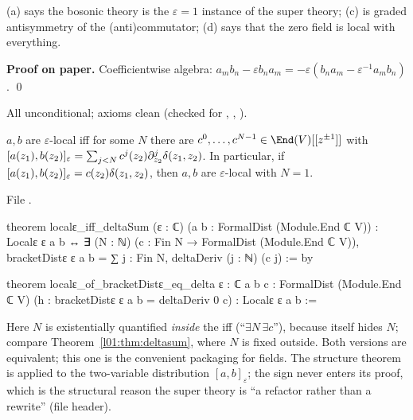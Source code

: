 \begin{physics}
(a) says the bosonic theory is the $\varepsilon = 1$ instance of the super theory; (c) is graded
antisymmetry of the (anti)commutator; (d) says that the zero field is local with everything.
\end{physics}

\textbf{Proof on paper.} Coefficientwise algebra: $a_mb_n-\varepsilon b_na_m = -\varepsilon(b_na_m-\varepsilon^{-1}a_mb_n)$. \qed

\begin{status}
All unconditional; axioms clean (checked for , ,
).
\end{status}

\begin{theorem}\label{l01:thm:epsdeltasum}
$a,b$ are $\varepsilon$-local iff for some $N$ there are $c^0,\dots,c^{N-1}\in\End(\loneV)[[z^{\pm1}]]$ with
$[a(z_1),b(z_2)]_\varepsilon = \sum_{j<N}c^j(z_2)\partial^j_{z_2}\delta(z_1,z_2)$. In particular, if
$[a(z_1),b(z_2)]_\varepsilon = c(z_2)\delta(z_1,z_2)$, then $a,b$ are $\varepsilon$-local with $N = 1$.
\end{theorem}

\noindent File .
\begin{leancode}
theorem localε_iff_deltaSum (ε : ℂ) (a b : FormalDist (Module.End ℂ V)) :
    Localε ε a b ↔ ∃ (N : ℕ) (c : Fin N → FormalDist (Module.End ℂ V)),
      bracketDistε ε a b = ∑ j : Fin N, deltaDeriv (j : ℕ) (c j) := by

theorem localε_of_bracketDistε_eq_delta {ε : ℂ} {a b c : FormalDist (Module.End ℂ V)}
    (h : bracketDistε ε a b = deltaDeriv 0 c) : Localε ε a b :=
\end{leancode}

\begin{dictionary}
Here $N$ is existentially quantified \emph{inside} the iff (``$\exists N\,\exists c$''), because  itself
hides $N$; compare Theorem~\ref{l01:thm:deltasum}, where $N$ is fixed outside. Both versions are equivalent;
this one is the convenient packaging for fields. The structure theorem is applied to the two-variable
distribution $[a,b]_\varepsilon$; the sign never enters its proof, which is the structural reason the super
theory is ``a refactor rather than a rewrite'' (file header).
\end{dictionary}

